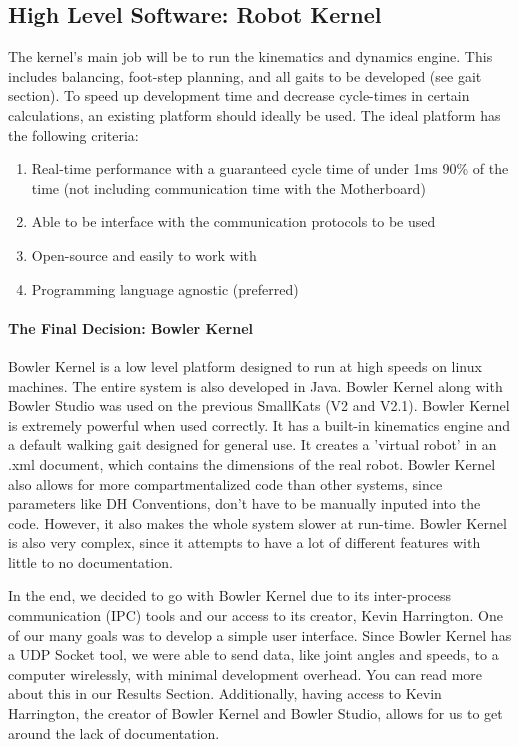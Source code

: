     \subsection{High Level Software: Robot Kernel}
        The kernel's main job will be to run the kinematics and dynamics engine. This includes balancing, foot-step planning, and all gaits to be developed (see gait section). To speed up development time and decrease cycle-times in certain calculations, an existing platform should ideally be used. The ideal platform has the following criteria:
        \begin{enumerate}
            \item Real-time performance with a guaranteed cycle time of under 1ms 90\% of the time (not including communication time with the Motherboard)
            \item Able to be interface with the communication protocols to be used
            \item Open-source and easily to work with
            \item Programming language agnostic (preferred)
        \end{enumerate}

        \paragraph*{The Final Decision: Bowler Kernel}
        Bowler Kernel is a low level platform designed to run at high speeds on linux machines. The entire system is also developed in Java. Bowler Kernel along with Bowler Studio was used on the previous SmallKats (V2 and V2.1). Bowler Kernel is extremely powerful when used correctly. It has a built-in kinematics engine and a default walking gait designed for general use. It creates a 'virtual robot' in an .xml document, which contains the dimensions of the real robot. Bowler Kernel also allows for more compartmentalized code than other systems, since parameters like DH Conventions, don't have to be manually inputed into the code. However, it also makes the whole system slower at run-time. Bowler Kernel is also very complex, since it attempts to have a lot of different features with little to no documentation.

        In the end, we decided to go with Bowler Kernel due to its inter-process communication (IPC) tools and our access to its creator, Kevin Harrington. One of our many goals was to develop a simple user interface. Since Bowler Kernel has a UDP Socket tool, we were able to send data, like joint angles and speeds, to a computer wirelessly, with minimal development overhead. You can read more about this in our Results Section. Additionally, having access to Kevin Harrington, the creator of Bowler Kernel and Bowler Studio, allows for us to get around the lack of documentation.

